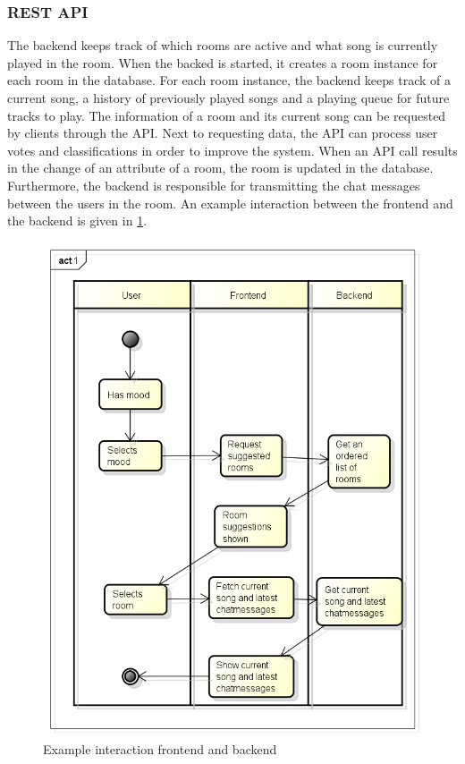 \subsubsection{REST API}
The backend keeps track of which rooms are active and what song is currently played in the room.
When the backed is started, it creates a room instance for each room in the database.
For each room instance, the backend keeps track of a current song, a history of previously played songs 
and a playing queue for future tracks to play.
The information of a room and its current song can be requested by clients through the API.
Next to requesting data, the API can process user votes and classifications in order to improve the system.
When an API call results in the change of an attribute of a room, the room is updated in the database.
Furthermore, the backend is responsible for transmitting the chat messages between the users in the room.
An example interaction between the frontend and the backend is given in \ref{fig: backendInteraction}.

\begin{figure}[H]
\includegraphics[scale=.4]{backendInteraction.png}
\caption{Example interaction frontend and backend}
\label{fig: backendInteraction}
\end{figure}


